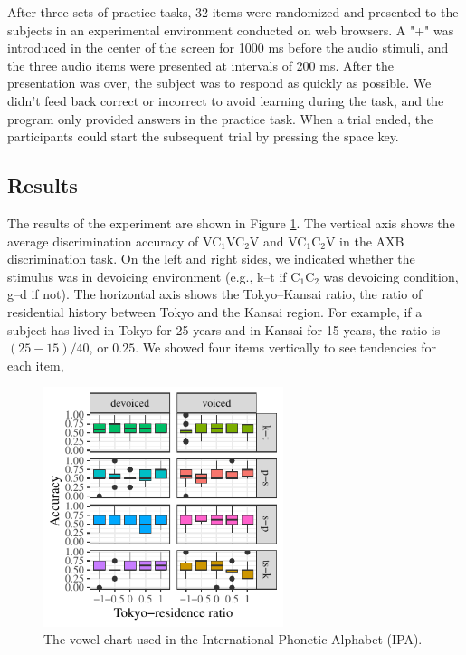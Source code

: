 \documentclass[a4paper,11pt,twocolumn]{article}
\begin{document}
After three sets of practice tasks, 32 items were randomized and presented to the subjects in an experimental environment conducted on web browsers. A "+" was introduced in the center of the screen for 1000 ms before the audio stimuli, and the three audio items were presented at intervals of 200 ms. After the presentation was over, the subject was to respond as quickly as possible. We didn't feed back correct or incorrect to avoid learning during the task, and the program only provided answers in the practice task. When a trial ended, the participants could start the subsequent trial by pressing the space key.

\subsection{Results}

The results of the experiment are shown in Figure \ref{fig:axb_results}. The vertical axis shows the average discrimination accuracy of VC$_\text{1}$VC$_\text{2}$V and VC$_\text{1}$C$_\text{2}$V in the AXB discrimination task. On the left and right sides, we indicated whether the stimulus was in devoicing environment (e.g., k--t if C$_\text{1}$C$_\text{2}$ was devoicing condition, g--d if not). The horizontal axis shows the Tokyo--Kansai ratio, the ratio of residential history between Tokyo and the Kansai region. For example, if a subject has lived in Tokyo for 25 years and in Kansai for 15 years, the ratio is $(25-15)/40$, or $0.25$. We showed four items vertically to see tendencies for each item,

\begin{figure}[!ht]
\begin{center}
\includegraphics[width=7cm]{../results/artifact/results_axb_allophone.pdf}
\caption{The vowel chart used in the International Phonetic
Alphabet (IPA).}\label{fig:axb_results}
\end{center}
\end{figure}
\end{document}
